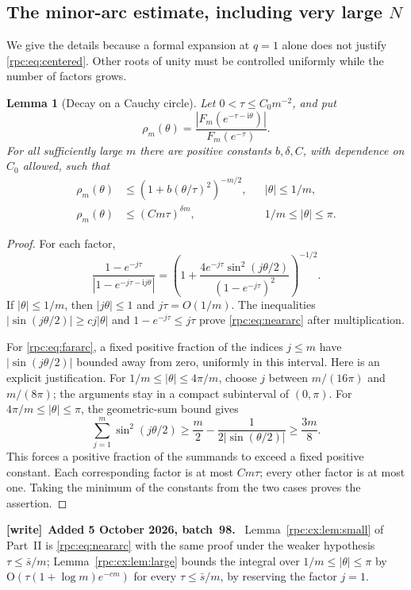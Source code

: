 \documentclass[11pt]{article}
\newtheorem{lemma}[theorem]{Lemma}
\theoremstyle{definition}
\theoremstyle{remark}
\newcommand{\ii}{\mathrm i}
\numberwithin{equation}{section}
\newenvironment{writenote}[1][]{\par\smallskip\begingroup\small
 \noindent\textbf{[write]}\if\relax\detokenize{#1}\relax\else~\textbf{#1.}\fi\ }%
 {\par\endgroup\smallskip}
\begin{document}
\subsection{The minor-arc estimate, including very large \texorpdfstring{$N$}{N}}

We give the details because a formal expansion at $q=1$ alone does not justify
\eqref{rpc:eq:centered}. Other roots of unity must be controlled uniformly while
the number of factors grows.

\begin{lemma}[Decay on a Cauchy circle]\label{rpc:lem:arcs}
Let $0<\tau\le C_0m^{-2}$, and put
\[
 \rho_m(\theta)=\frac{|F_m(e^{-\tau-\ii\theta})|}{F_m(e^{-\tau})}.
\]
For all sufficiently large $m$ there are positive constants $b,\delta,C$,
with dependence on $C_0$ allowed, such that
\begin{align}
 \rho_m(\theta)&\le
    \left(1+b(\theta/\tau)^2\right)^{-m/2},
                       &&|\theta|\le1/m,\label{rpc:eq:neararc}\\
 \rho_m(\theta)&\le(Cm\tau)^{\delta m},
                       &&1/m\le|\theta|\le\pi.\label{rpc:eq:fararc}
\end{align}
\end{lemma}
\begin{proof}
For each factor,
\[
 \frac{1-e^{-j\tau}}{|1-e^{-j\tau-\ii j\theta}|}
 =\left(1+\frac{4e^{-j\tau}\sin^2(j\theta/2)}
                  {(1-e^{-j\tau})^2}\right)^{-1/2}.
\]
If $|\theta|\le1/m$, then $|j\theta|\le1$ and $j\tau=O(1/m)$.
The inequalities $|\sin(j\theta/2)|\ge c j|\theta|$ and
$1-e^{-j\tau}\le j\tau$ prove \eqref{rpc:eq:neararc} after multiplication.

For \eqref{rpc:eq:fararc}, a fixed positive fraction of the indices $j\le m$
have $|\sin(j\theta/2)|$ bounded away from zero, uniformly in this interval.
Here is an explicit justification. For $1/m\le|\theta|\le4\pi/m$, choose
$j$ between $m/(16\pi)$ and $m/(8\pi)$; the arguments stay in a compact
subinterval of $(0,\pi)$. For $4\pi/m\le|\theta|\le\pi$, the geometric-sum
bound gives
\[
 \sum_{j=1}^m\sin^2(j\theta/2)
 \ge\frac m2-\frac1{2|\sin(\theta/2)|}\ge\frac{3m}{8}.
\]
This forces a positive fraction of the summands to exceed a fixed positive
constant. Each corresponding factor is at most $Cm\tau$; every other factor
is at most one. Taking the minimum of the constants from the two cases proves
the assertion.
\end{proof}

\begin{writenote}[Added 5 October 2026, batch~98]
Lemma~\ref{rpc:cx:lem:small} of Part~II is \eqref{rpc:eq:neararc} with the same
proof under the weaker hypothesis $\tau\le\bar s/m$;
Lemma~\ref{rpc:cx:lem:large} bounds the integral over $1/m\le|\theta|\le\pi$ by
$\mathrm O(\tau(1+\log m)e^{-cm})$ for every $\tau\le\bar s/m$, by reserving
the factor $j=1$.
\end{writenote}
\end{document}
